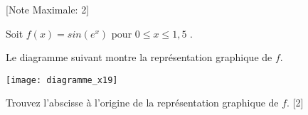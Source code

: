 \begin{question}
  \hspace*{\fill} [Note Maximale: 2]\par
  \medskip
  \noindent Soit $f(x) = sin(e^x)$ pour $0 \le x \le 1,5$ .\par
  \medskip
  \begin{center} %
    \noindent Le diagramme suivant montre la représentation graphique de $f$.\par
    \texttt{[image: diagramme\_x19]}\par
  \end{center} %

  \medskip
  \noindent Trouvez l'abscisse à l'origine de la représentation graphique de $f$.\hspace*{\fill} [2]\par
  
\end{question}
